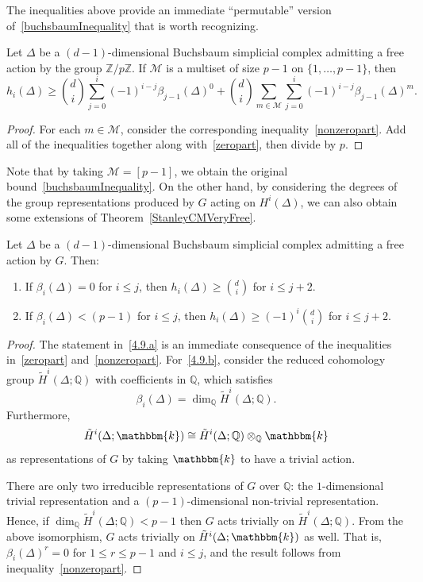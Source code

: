\documentclass[ALCO,ThmDefs,Unicode]{cedram}
\newcommand{\field}{\mathbbm{k}}
\newcommand{\QQ}{{\mathbb Q}}
\newcommand{\ZZ}{{\mathbb Z}}
\newcommand*{\alphenumi}{\renewcommand*{\theenumi}{\alph{enumi}}}
\begin{document}
The inequalities above provide an immediate ``permutable'' version of~\eqref{buchsbaumInequality} that is worth recognizing.

\begin{coro}\label{multiset}
Let $\Delta$ be a $(d-1)$-dimensional Buchsbaum simplicial complex admitting a free action by the group $\ZZ/p\ZZ$. If $\mathcal{M}$ is a multiset of size $p-1$ on $\{1, \ldots, p-1\}$, then
\[
h_i(\Delta)\ge\binom{d}{i}\sum_{j=0}^i(-1)^{i-j}\beta_{j-1}(\Delta)^0+\binom{d}{i}\sum_{m\in\mathcal{M}}\sum_{j=0}^i(-1)^{i-j}\beta_{j-1}(\Delta)^m.
\]
\end{coro}

\begin{proof}
For each $m\in \mathcal{M}$, consider the corresponding inequality~\eqref{nonzeropart}. Add all of the inequalities together along with~\eqref{zeropart}, then divide by $p$.
\end{proof}

Note that by taking $\mathcal{M}=[p-1]$, we obtain the original bound~\eqref{buchsbaumInequality}. On the other hand, by considering the degrees of the group representations produced by $G$ acting on $H^i(\Delta)$, we can also obtain some extensions of Theorem~\ref{StanleyCMVeryFree}.

\begin{coro}
Let $\Delta$ be a $(d-1)$-dimensional Buchsbaum simplicial complex admitting a free action by $G$. Then:
\begin{enumerate}%
\item \label{4.9.a} If $\beta_i(\Delta)=0$ for $i\le j$, then $h_i(\Delta)\ge\binom{d}{i}$ for $i\le j+2$.
\item \label{4.9.b} If $\beta_i(\Delta)<(p-1)$ for $i\le j$, then $h_i(\Delta)\ge (-1)^i\binom{d}{i}$ for $i\le j+2$.
\end{enumerate}
\end{coro}

\begin{proof}
The statement in~\eqref{4.9.a} is an immediate consequence of the inequalities in~\eqref{zeropart} and~\eqref{nonzeropart}. For~\eqref{4.9.b}, consider the reduced cohomology group $\tilde{H}^i(\Delta; \QQ)$ with coefficients in $\QQ$, which satisfies
\[
\beta_i(\Delta)=\dim_\QQ \tilde{H}^i(\Delta; \QQ).
\]
Furthermore,
\[
\tilde{H}^i(\Delta; \field)\cong \tilde{H}^i(\Delta; \QQ)\otimes_\QQ \field
\]
as representations of $G$ by taking $\field$ to have a trivial action.

There are only two irreducible representations of $G$ over $\QQ$: the $1$-dimensional trivial representation and a $(p-1)$-dimensional non-trivial representation. Hence, if $\dim_\QQ \tilde{H}^i(\Delta; \QQ)<p-1$ then $G$ acts trivially on $\tilde{H}^i(\Delta; \QQ)$. From the above isomorphism, $G$ acts trivially on $\tilde{H}^i(\Delta;\field)$ as well. That is, $\beta_i(\Delta)^r =0$ for $1\le r\le p-1$ and $i\le j$, and the result follows from inequality~\eqref{nonzeropart}.
\end{proof}
\end{document}
